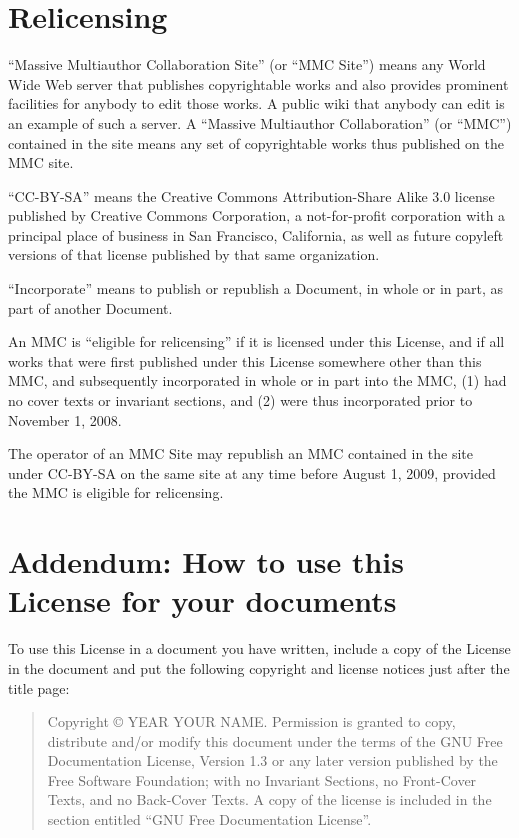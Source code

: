 \section{Relicensing}

``Massive Multiauthor Collaboration Site'' (or ``MMC Site'') means any
World Wide Web server that publishes copyrightable works and also
provides prominent facilities for anybody to edit those works.  A
public wiki that anybody can edit is an example of such a server.  A
``Massive Multiauthor Collaboration'' (or ``MMC'') contained in the
site means any set of copyrightable works thus published on the MMC
site.

``CC-BY-SA'' means the Creative Commons Attribution-Share Alike 3.0
license published by Creative Commons Corporation, a not-for-profit
corporation with a principal place of business in San Francisco,
California, as well as future copyleft versions of that license
published by that same organization.

``Incorporate'' means to publish or republish a Document, in whole or
in part, as part of another Document.

An MMC is ``eligible for relicensing'' if it is licensed under this
License, and if all works that were first published under this License
somewhere other than this MMC, and subsequently incorporated in whole
or in part into the MMC, (1) had no cover texts or invariant sections,
and (2) were thus incorporated prior to November 1, 2008.

The operator of an MMC Site may republish an MMC contained in the site
under CC-BY-SA on the same site at any time before August 1, 2009,
provided the MMC is eligible for relicensing.


\section*{Addendum: How to use this License for your documents}

To use this License in a document you have written, include a copy of
the License in the document and put the following copyright and
license notices just after the title page:

\bigskip
\begin{quote}
    Copyright \copyright{}  YEAR  YOUR NAME.
    Permission is granted to copy, distribute and/or modify this document
    under the terms of the GNU Free Documentation License, Version 1.3
    or any later version published by the Free Software Foundation;
    with no Invariant Sections, no Front-Cover Texts, and no Back-Cover Texts.
    A copy of the license is included in the section entitled ``GNU
    Free Documentation License''.
\end{quote}
\bigskip

